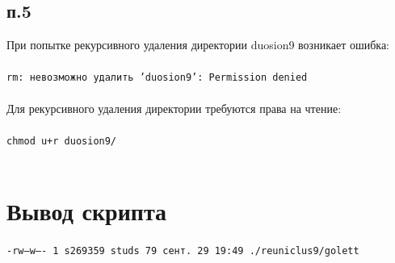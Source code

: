 \documentclass[11pt]{article}
\begin{document}
\subsection*{п.5}
При попытке рекурсивного удаления директории duosion9 возникает ошибка:\\\\
\texttt{rm: невозможно удалить 'duosion9': Permission denied}\\\\
Для рекурсивного удаления директории требуются права на чтение:\\\\
\texttt{chmod u+r duosion9/}\\\\
\section{Вывод скрипта}
\texttt{-rw--w---- 1 s269359 studs 79 сент. 29 19:49 ./reuniclus9/golett}\\\\
\end{document}
